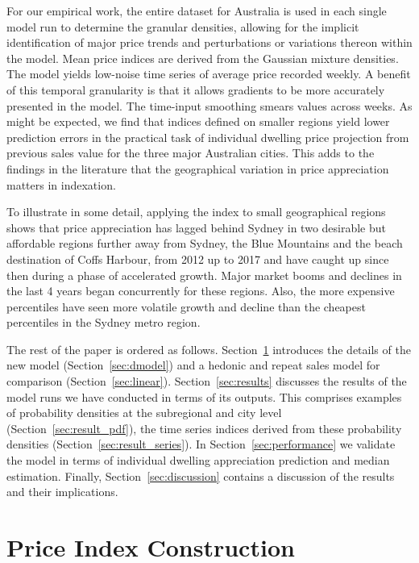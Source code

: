 For our empirical work, the entire dataset for Australia is used in each single model run to determine the granular densities, allowing for the implicit identification of major price trends and perturbations or variations thereon within the model. Mean price indices are derived from the Gaussian mixture densities. The model yields low-noise time series of average price recorded weekly. A benefit of this temporal granularity is that it allows gradients to be more accurately presented in the model. The time-input smoothing smears values across weeks. 
As might be expected, we find that indices defined on smaller regions yield lower prediction errors in the practical task of individual dwelling price projection from previous sales value for the three major Australian cities. This adds to the findings in the literature that the geographical variation in price appreciation matters in indexation.

To illustrate in some detail, applying the index to small geographical regions shows that price appreciation has lagged behind Sydney in two desirable but affordable regions further away from Sydney, the Blue Mountains and the beach destination of Coffs Harbour, from 2012 up to 2017 and have caught up since then during a phase of accelerated growth. Major market booms and declines in the last 4 years began concurrently for these regions. Also, the more expensive percentiles have seen more volatile growth and decline than the cheapest percentiles in the Sydney metro region. 


The rest of the paper is ordered as follows. Section~\ref{formulation} introduces the details of the new model (Section~\ref{sec:dmodel}) and a hedonic and repeat sales model for comparison  (Section~\ref{sec:linear}). Section~\ref{sec:results} discusses the results of the model runs we have conducted in terms of its outputs. This comprises examples of probability densities at the subregional and city level (Section~\ref{sec:result_pdf}), 
the time series indices derived from these probability densities (Section~\ref{sec:result_series}). In Section~\ref{sec:performance} we validate the model in terms of individual dwelling appreciation prediction and median estimation. 
Finally, Section~\ref{sec:discussion} contains a discussion of the results and their implications. 


\section{Price Index Construction}
\label{formulation}

